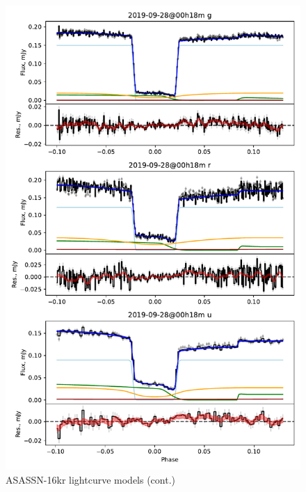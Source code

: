 \begin{figure}
    \centering
    \includegraphics[width=\textwidth]{figures/results/three_cvs_with_weird_colours/ASASSN-16kr/ASASSN-16kr_5.pdf}
    \caption{ASASSN-16kr lightcurve models (cont.)}
    \label{fig:ASASSN-16kr all lightcurves cont 4}
\end{figure}
